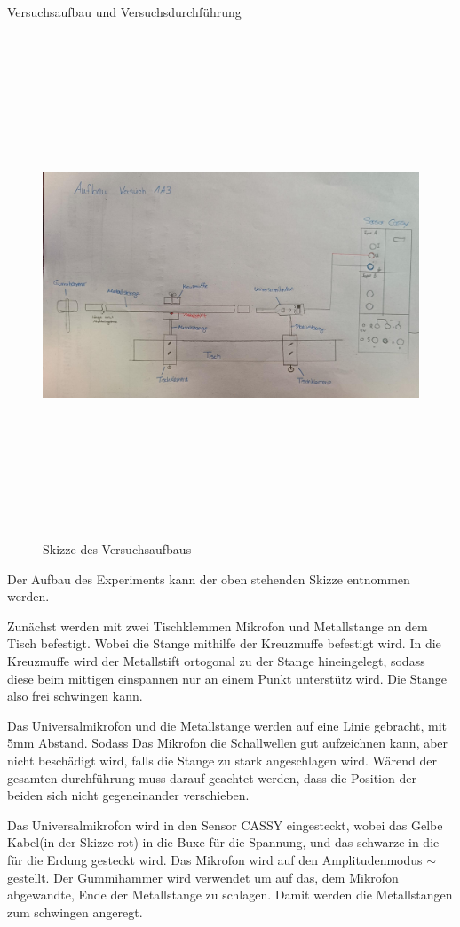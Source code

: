 \documentclass[twoside]{protokoll}
\begin{document}
\begin{aufgabe}{Versuchsaufbau und Versuchsdurchführung}
\begin{figure}[h]
  \centering
  \includegraphics[width=15cm,height=15cm,keepaspectratio]{Bilder/SkizzeAufbau.jpeg}
  \caption{Skizze des Versuchsaufbaus}
  \label{fig:image_label}
  \centering
\end{figure}
 
Der Aufbau des Experiments kann der oben stehenden Skizze entnommen werden. 

Zunächst werden mit zwei Tischklemmen Mikrofon und Metallstange an dem Tisch befestigt. Wobei die Stange mithilfe der Kreuzmuffe befestigt wird. In die Kreuzmuffe wird der Metallstift ortogonal zu der Stange hineingelegt, sodass diese beim mittigen einspannen nur an einem Punkt unterstütz wird. Die Stange also frei schwingen kann. 

Das Universalmikrofon und die Metallstange werden auf eine Linie gebracht, mit 5mm Abstand. Sodass Das Mikrofon die Schallwellen gut aufzeichnen kann, aber nicht beschädigt wird, falls die Stange zu stark angeschlagen wird. Wärend der gesamten durchführung muss darauf geachtet werden, dass die Position der beiden sich nicht gegeneinander verschieben. 


Das Universalmikrofon wird in den Sensor CASSY eingesteckt, wobei das Gelbe Kabel(in der Skizze rot) in die Buxe für die Spannung, und das schwarze in die für die Erdung gesteckt wird. Das Mikrofon wird auf den Amplitudenmodus $\sim$ gestellt. Der Gummihammer wird verwendet um auf das, dem Mikrofon abgewandte, Ende der Metallstange zu schlagen. Damit werden die Metallstangen zum schwingen angeregt.


\end{aufgabe}
\end{document}
